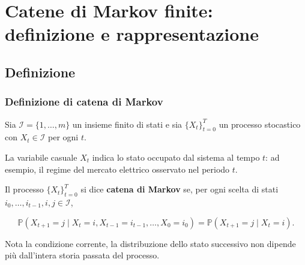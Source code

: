 \documentclass[handout]{beamer}%
\providecommand{\Prob}{\mathbb{P}}
\providecommand{\QTR}[2]{\csname #1\endcsname{#2}}
\begin{document}


\section{Catene di Markov finite: definizione e rappresentazione}

\subsection{Definizione}%

\begin{frame}%
%

\frametitle{Definizione di catena di Markov}%
%

%


Sia $\mathcal{I}=\{1,\ldots,m\}$ un insieme finito di stati e sia
$\{X_{t}\}_{t=0}^{T}$ un processo stocastico con $X_{t}\in\mathcal{I}$ per
ogni $t$.

\medskip

La variabile casuale $X_{t}$ indica lo stato occupato dal sistema al tempo
$t$: ad esempio, il regime del mercato elettrico osservato nel periodo $t$.

\medskip

Il processo $\{X_{t}\}_{t=0}^{T}$ si dice \textbf{catena di Markov} se, per
ogni scelta di stati $i_{0},\ldots,i_{t-1},i,j\in\mathcal{I}$,%

\[
\Prob(X_{t+1}=j \mid X_{t}=i, X_{t-1}=i_{t-1}, \ldots, X_{0}=i_{0}) =
\Prob(X_{t+1}=j \mid X_{t}=i).
\]


\medskip

\begin{center}
{\small Nota la condizione corrente, la distribuzione dello stato successivo
non dipende pi\`{u} dall'intera storia passata del processo.}
\end{center}%

\transboxout
\end{frame}%
\end{document}
